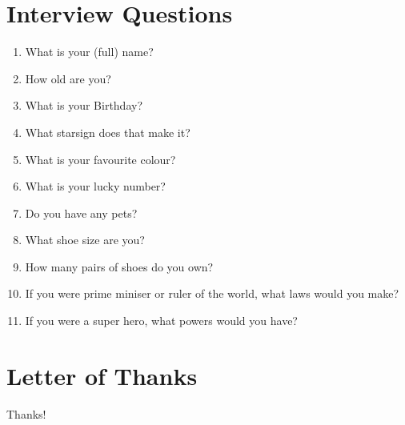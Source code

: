 \documentclass[letterpaper, 12pt]{report}
\begin{document}
\appendix

\chapter{Interview Questions}
\begin{enumerate}[leftmargin=*]
	\item What is your (full) name?
	\item How old are you?
	\item What is your Birthday?
	\item What starsign does that make it?
	\item What is your favourite colour?
	\item What is your lucky number?
	\item Do you have any pets?
	\item What shoe size are you?
	\item How many pairs of shoes do you own?
	\item If you were prime miniser or ruler of the world, what laws would you make?
	\item If you were a super hero, what powers would you have?
\end{enumerate}

\chapter{Letter of Thanks}
Thanks!

\nocite{*}


\end{document}
